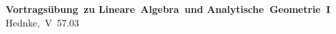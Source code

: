 \small\textbf{\nohyphens{Vortragsübung~zu Lineare~Algebra~und Analytische~Geometrie~I}}
\footnotesize\nohyphens{Hednke,~V~57.03}
